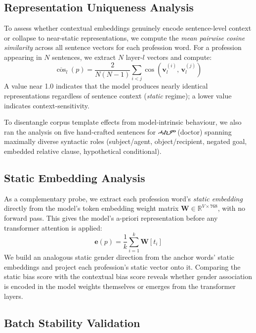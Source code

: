 \subsection{Representation Uniqueness Analysis}

To assess whether contextual embeddings genuinely encode sentence-level context
or collapse to near-static representations, we compute the \emph{mean pairwise
cosine similarity} across all sentence vectors for each profession word. For a
profession appearing in $N$ sentences, we extract $N$ layer-$l$ vectors and
compute:
\begin{equation}
  \overline{\cos}_l(p) = \frac{2}{N(N-1)}
    \sum_{i < j} \cos\!\left(\mathbf{v}^{(i)}_l,\, \mathbf{v}^{(j)}_l\right)
\end{equation}
A value near 1.0 indicates that the model produces nearly identical
representations regardless of sentence context (\emph{static} regime); a lower
value indicates context-sensitivity.

To disentangle corpus template effects from model-intrinsic behaviour, we also
ran the analysis on five hand-crafted sentences for \textit{ሓኪም} (doctor)
spanning maximally diverse syntactic roles (subject/agent, object/recipient,
negated goal, embedded relative clause, hypothetical conditional).

\subsection{Static Embedding Analysis}

As a complementary probe, we extract each profession word's \emph{static
embedding} directly from the model's token embedding weight matrix
$\mathbf{W} \in \mathbb{R}^{V \times 768}$, with no forward pass. This gives
the model's a-priori representation before any transformer attention is
applied:
\begin{equation}
  \mathbf{e}(p) = \frac{1}{k} \sum_{i=1}^{k} \mathbf{W}[t_i]
\end{equation}
We build an analogous static gender direction from the anchor words' static
embeddings and project each profession's static vector onto it. Comparing
the static bias score with the contextual bias score reveals whether gender
association is encoded in the model weights themselves or emerges from the
transformer layers.

\subsection{Batch Stability Validation}

